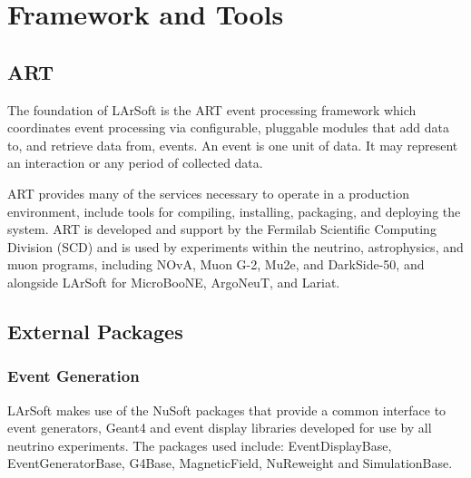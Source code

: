 \documentclass[12pt]{elsarticle}
\begin{document}
\section{Framework and Tools}
\subsection{ART}
The foundation of LArSoft is the ART event processing framework which coordinates event processing via configurable, pluggable modules that add data to, and retrieve data from, events.\cite{art-ref}  An event is one unit of data. It may represent an interaction or any period of collected data.

ART provides many of the services necessary to operate in a production environment, include tools for compiling, installing, packaging, and deploying the system.  ART is developed and support by the Fermilab Scientific Computing Division (SCD) and is used by experiments within the neutrino, astrophysics, and muon programs, including NOvA, Muon G-2, Mu2e, and DarkSide-50, and alongside LArSoft for MicroBooNE, ArgoNeuT, and Lariat.

\subsection{External Packages}
\subsubsection{Event Generation}
LArSoft makes use of the NuSoft packages that provide a common interface to event generators, Geant4 and event display libraries developed for use by all neutrino experiments. The packages used include:    EventDisplayBase, EventGeneratorBase, G4Base, MagneticField, NuReweight and SimulationBase.
\end{document}
